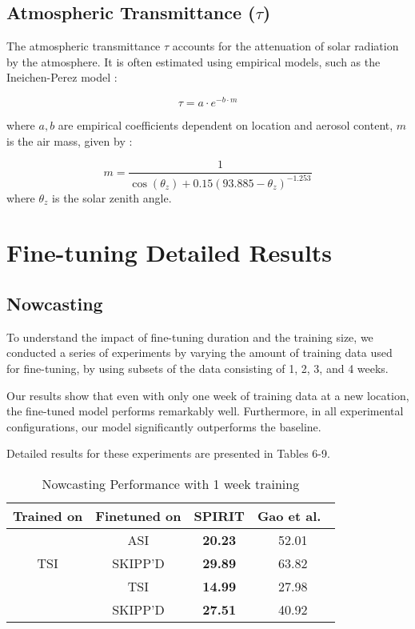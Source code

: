 \subsection{Atmospheric Transmittance (\( \tau \))}
\label{subsec:appendix_atmospheric_transmittance}
The atmospheric transmittance \( \tau \) accounts for the attenuation of solar radiation by the atmosphere. It is often estimated using empirical models, such as the Ineichen-Perez model \cite{clearsky1}:

\begin{equation}
    \tau = a \cdot e^{-b \cdot m}
\end{equation}

where \( a, b \) are empirical coefficients dependent on location and aerosol content, \( m \) is the air mass, given by \cite{ineichen1}:

\begin{equation}
    m = \frac{1}{\cos(\theta_z) + 0.15 (93.885 - \theta_z)^{-1.253}}
\end{equation}
where \( \theta_z \) is the solar zenith angle.

\section{Fine-tuning Detailed Results}
\label{sec:appendix_fine-tuning_detailed_results}
\subsection{Nowcasting}
\label{subsec:appendix_nowcasting}
To understand the impact of fine-tuning duration and the training size, we conducted a series of experiments by varying the amount of training data used for fine-tuning, by using subsets of the data consisting of 1, 2, 3, and 4 weeks.

Our results show that even with only one week of training data at a new location, the fine-tuned model performs remarkably well. Furthermore, in all experimental configurations, our model significantly outperforms the baseline.

Detailed results for these experiments are presented in Tables 6-9.

\begin{table}[h]
  \caption{
  Nowcasting Performance with 1 week training
  }
  \label{tab:oneweek_nowcast}
  \centering
  \renewcommand{\arraystretch}{1.2}
  \begin{tabular}{@{}c c c c@{}}
    \hline
    \textbf{Trained on} & \textbf{Finetuned on} & \textbf{SPIRIT} & \textbf{Gao et al.~\cite{wacv2022}} \\
    \hline
    \multirow{3}{*}{TSI} & ASI & \textbf{20.23}  & 52.01 \\
                          & SKIPP'D & \textbf{29.89}  & 63.82 \\
    \cline{1-4}
    \multirow{3}{*}{ASI} & TSI & \textbf{14.99}  & 27.98 \\
                          & SKIPP'D & \textbf{27.51}  & 40.92 \\
    \hline
  \end{tabular}
\end{table}

